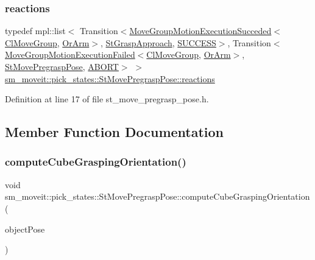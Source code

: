 \subsubsection{\texorpdfstring{reactions}{reactions}}
{\footnotesize\ttfamily typedef mpl\+::list$<$ Transition$<$\hyperlink{structmoveit__z__client_1_1MoveGroupMotionExecutionSucceded}{Move\+Group\+Motion\+Execution\+Succeded}$<$\hyperlink{classmoveit__z__client_1_1ClMoveGroup}{Cl\+Move\+Group}, \hyperlink{classsm__moveit_1_1OrArm}{Or\+Arm}$>$, \hyperlink{structsm__moveit_1_1pick__states_1_1StGraspApproach}{St\+Grasp\+Approach}, \hyperlink{classSUCCESS}{S\+U\+C\+C\+E\+SS}$>$, Transition$<$\hyperlink{structmoveit__z__client_1_1MoveGroupMotionExecutionFailed}{Move\+Group\+Motion\+Execution\+Failed}$<$\hyperlink{classmoveit__z__client_1_1ClMoveGroup}{Cl\+Move\+Group}, \hyperlink{classsm__moveit_1_1OrArm}{Or\+Arm}$>$, \hyperlink{structsm__moveit_1_1pick__states_1_1StMovePregraspPose}{St\+Move\+Pregrasp\+Pose}, \hyperlink{classABORT}{A\+B\+O\+RT}$>$ $>$ \hyperlink{structsm__moveit_1_1pick__states_1_1StMovePregraspPose_a24457ed9411566498ea50222265ad652}{sm\+\_\+moveit\+::pick\+\_\+states\+::\+St\+Move\+Pregrasp\+Pose\+::reactions}}



Definition at line 17 of file st\+\_\+move\+\_\+pregrasp\+\_\+pose.\+h.



\subsection{Member Function Documentation}
\mbox{\label{structsm__moveit_1_1pick__states_1_1StMovePregraspPose_afe2fcedf9034c3c2999e81fb289cf459}} 
\subsubsection{\texorpdfstring{compute\+Cube\+Grasping\+Orientation()}{computeCubeGraspingOrientation()}}
{\footnotesize\ttfamily void sm\+\_\+moveit\+::pick\+\_\+states\+::\+St\+Move\+Pregrasp\+Pose\+::compute\+Cube\+Grasping\+Orientation (\begin{DoxyParamCaption}\item[{geometry\+\_\+msgs\+::\+Pose\+Stamped \&}]{object\+Pose }\end{DoxyParamCaption})\hspace{0.3cm}{\ttfamily [inline]}}



